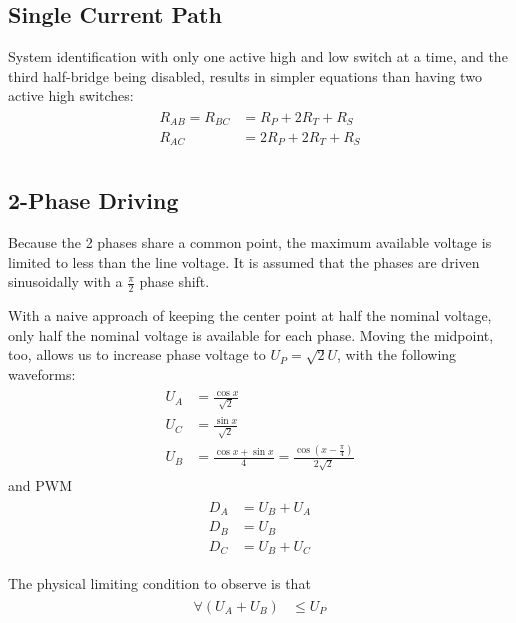 \documentclass[12pt,a4paper,oneside,openany]{article}
\begin{document}
\subsection{Single Current Path}

System identification  with only one active high and low switch at a time, and the third half-bridge being disabled, results in simpler equations than having two active high switches:
\begin{gather}
\begin{aligned}
R_{AB} = R_{BC} &= R_P + 2 R_T + R_S \\
R_{AC} &= 2 R_P + 2 R_T + R_S \\
\end{aligned}
\end{gather}

\subsection{2-Phase Driving}

Because the 2 phases share a common point, the maximum available voltage is limited to less than the line voltage. It is assumed that the phases are driven sinusoidally with a $\frac{\pi}{2}$ phase shift.

With a naive approach of keeping the center point at half the nominal voltage, only half the nominal voltage is available for each phase. Moving the midpoint, too, allows us to increase phase voltage to $U_P = \sqrt{2} U$, with the following waveforms:
\begin{gather}
\begin{aligned}
U_{A} &= \frac{\cos x}{\sqrt{2}} \\
U_{C} &= \frac{\sin x}{\sqrt{2}} \\
U_{B} &= \frac{\cos x + \sin x}{4} = \frac{\cos \left(x - \frac{\pi}{4}\right)}{2 \sqrt{2}}
\end{aligned}
\end{gather}
and PWM
\begin{gather}
\begin{aligned}
D_{A} &= U_{B} + U_{A} \\
D_{B} &= U_{B} \\
D_{C} &= U_{B} + U_{C}
\end{aligned}
\end{gather}

The physical limiting condition to observe is that 
\begin{gather}
\begin{aligned}
\forall \left( U_{A}+U_{B} \right) &\leq U_P
\end{aligned}
\end{gather}
\end{document}
